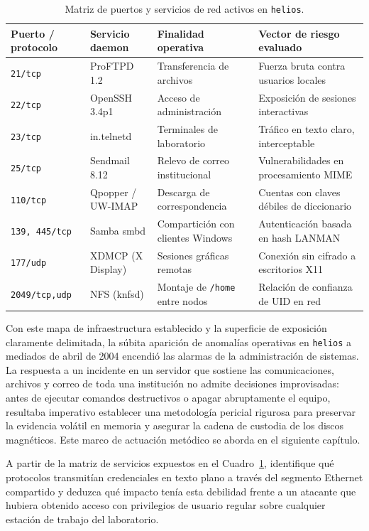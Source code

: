 \begin{table}[htbp]
\centering
\small
\begin{tabularx}{\textwidth}{@{} l l X X @{}}
\toprule
\textbf{Puerto / protocolo} & \textbf{Servicio daemon} & \textbf{Finalidad operativa} & \textbf{Vector de riesgo evaluado} \\
\midrule
\texttt{21/tcp} & ProFTPD 1.2 & Transferencia de archivos & Fuerza bruta contra usuarios locales \\
\texttt{22/tcp} & OpenSSH 3.4p1 & Acceso de administración & Exposición de sesiones interactivas \\
\texttt{23/tcp} & in.telnetd & Terminales de laboratorio & Tráfico en texto claro, interceptable \\
\texttt{25/tcp} & Sendmail 8.12 & Relevo de correo institucional & Vulnerabilidades en procesamiento MIME \\
\texttt{110/tcp} & Qpopper / UW-IMAP & Descarga de correspondencia & Cuentas con claves débiles de diccionario \\
\texttt{139, 445/tcp} & Samba smbd & Compartición con clientes Windows & Autenticación basada en hash LANMAN \\
\texttt{177/udp} & XDMCP (X Display) & Sesiones gráficas remotas & Conexión sin cifrado a escritorios X11 \\
\texttt{2049/tcp,udp} & NFS (knfsd) & Montaje de \texttt{/home} entre nodos & Relación de confianza de UID en red \\
\bottomrule
\end{tabularx}
\caption{Matriz de puertos y servicios de red activos en \texttt{helios}.}
\label{tab:servicios_expuestos}
\end{table}

Con este mapa de infraestructura establecido y la superficie de exposición claramente delimitada, la súbita aparición de anomalías operativas en \texttt{helios} a mediados de abril de 2004 encendió las alarmas de la administración de sistemas. La respuesta a un incidente en un servidor que sostiene las comunicaciones, archivos y correo de toda una institución no admite decisiones improvisadas: antes de ejecutar comandos destructivos o apagar abruptamente el equipo, resultaba imperativo establecer una metodología pericial rigurosa para preservar la evidencia volátil en memoria y asegurar la cadena de custodia de los discos magnéticos. Este marco de actuación metódico se aborda en el siguiente capítulo.

\begin{retoforense}
A partir de la matriz de servicios expuestos en el Cuadro~\ref{tab:servicios_expuestos}, identifique qué protocolos transmitían credenciales en texto plano a través del segmento Ethernet compartido y deduzca qué impacto tenía esta debilidad frente a un atacante que hubiera obtenido acceso con privilegios de usuario regular sobre cualquier estación de trabajo del laboratorio.
\end{retoforense}

